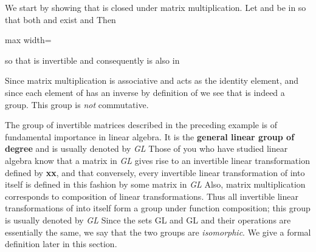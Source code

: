 \documentclass[11pt,oneside]{article}
\begin{document}
\begin{BookBody}
 We start by showing that  is closed under matrix multiplication. Let  and  be in  so that both  and  exist and  Then

\begin{center}\begin{adjustbox}{max width=\linewidth}\end{adjustbox}\end{center}

\noindent so that  is invertible and consequently is also in 

Since matrix multiplication is associative and  acts as the identity element, and since each element of  has an inverse by definition of  we see that  is indeed a group. This group is\textit{ not} commutative. \BookEnd{\blacktriangle}

The group of invertible  matrices described in the preceding example is of fundamental importance in linear algebra. It is the\textbf{ general linear group of degree}  
and is usually denoted by\textit{ GL} Those of you who have studied linear algebra know that a matrix  in\textit{ GL} gives rise to an invertible linear transformation   defined by \textbf{x}\textbf{x}, and that conversely, every invertible linear transformation of  into itself is defined in this fashion by some matrix in\textit{ GL} Also, matrix multiplication corresponds to composition of linear transformations. Thus all invertible linear transformations of  into itself form a group under function composition; this group is usually denoted by\textit{ GL} Since the sets GL and GL and their operations are essentially the same, we say that the two groups are\textit{ isomorphic}. We give a formal definition later in this section.

\end{BookBody}
\end{document}
